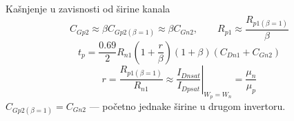 \begin{frame}[label=09_3-s011]{Kašnjenje u zavisnosti od širine kanala}
\[C_{Gp2}\approx\beta C_{Gp2(\beta=1)}\approx\beta C_{Gn2},\qquad
R_{p1}\approx\frac{R_{p1(\beta=1)}}\beta\]
\[t_p=\frac{0.69}2R_{n1}\left(1+\frac r\beta\right)(1+\beta)(C_{Dn1}+C_{Gn2})\]
\[r=\frac{R_{p1(\beta=1)}}{R_{n1}}\approx
\left.\frac{I_{Dnsat}}{I_{Dpsat}}\right|_{W_p=W_n}=\frac{\mu_n}{\mu_p}\]
$C_{Gp2(\beta=1)}=C_{Gn2}$ — početno jednake širine u drugom invertoru.
\end{frame}
